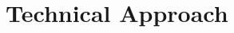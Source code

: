 \documentclass[dissertation.tex]{subfiles}
\begin{document}
\chapter{Technical Approach}
\end{document}
